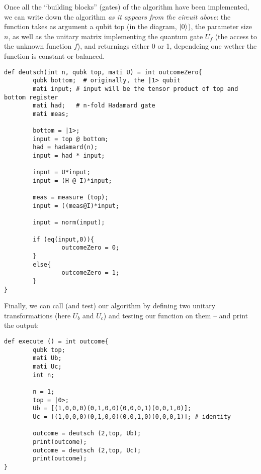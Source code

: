 Once all the ``building blocks'' (gates) of the algorithm have been implemented, we can write down the algorithm \emph{as it appears from the circuit above}: the function takes as argument a qubit \textsf{top} (in the diagram, $|0\rangle$), the parameter size $n$, as well as the unitary matrix implementing the quantum  gate $U_f$ (the access to the unknown function $f$), and returnings either 0 or 1, dependeing one wether the function is constant or balanced.
\begin{lstlisting}
def deutsch(int n, qubk top, mati U) = int outcomeZero{       
        qubk bottom;  # originally, the |1> qubit    
        mati input; # input will be the tensor product of top and bottom register  
        mati had;   # n-fold Hadamard gate  
        mati meas;

        bottom = |1>;
        input = top @ bottom;
        had = hadamard(n);
        input = had * input;
        
        input = U*input;
        input = (H @ I)*input;
        
        meas = measure (top);        
        input = ((meas@I)*input;
        
        input = norm(input);
        
        if (eq(input,0)){
                outcomeZero = 0;
        }
        else{
                outcomeZero = 1;
        }
}
\end{lstlisting}

Finally, we can call (and test) our algorithm by defining two unitary transformations (here $U_b$ and $U_c$) and testing our function on them -- and print the output:
\begin{lstlisting}
def execute () = int outcome{
        qubk top;
        mati Ub;
        mati Uc;
        int n;
        
        n = 1;
        top = |0>;
        Ub = [(1,0,0,0)(0,1,0,0)(0,0,0,1)(0,0,1,0)];
        Uc = [(1,0,0,0)(0,1,0,0)(0,0,1,0)(0,0,0,1)]; # identity

        outcome = deutsch (2,top, Ub);
        print(outcome);
        outcome = deutsch (2,top, Uc);
        print(outcome);
}
\end{lstlisting}
%
